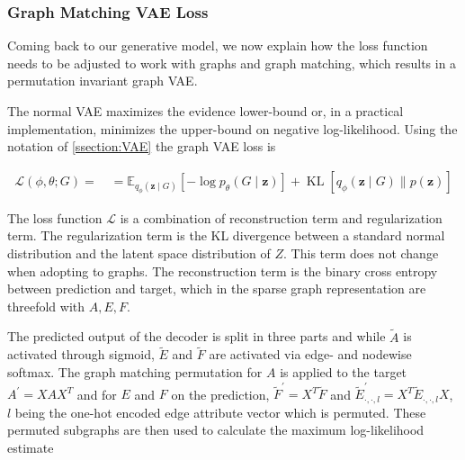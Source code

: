 \subsubsection{Graph Matching VAE Loss}
\label{ssec3:GVAEloss}
Coming back to our generative model, we now explain how the loss function needs to be adjusted to work with graphs and graph matching, which results in a permutation invariant graph VAE.

The normal VAE maximizes the evidence lower-bound or, in a practical implementation, minimizes the upper-bound on negative log-likelihood. Using the notation of \ref{ssection:VAE} the graph VAE loss is

\begin{equation}
    \begin{array}{l}
    \mathcal{L}(\phi, \theta ; G)=\quad=\mathbb{E}_{q_{\phi}(\mathbf{z} \mid G)}\left[-\log p_{\theta}(G \mid \mathbf{z})\right]+\operatorname{KL}\left[q_{\phi}(\mathbf{z} \mid G) \| p(\mathbf{z})\right]
    \end{array}
\end{equation}

The loss function $\mathcal{L}$ is a combination of reconstruction term and regularization term. The regularization term is the KL divergence between a standard normal distribution and the latent space distribution of $Z$. This term does not change when adopting to graphs. The reconstruction term is the binary cross entropy between prediction and target, which in the sparse graph representation are threefold with $A, E, F$. 



The predicted output of the decoder is split in three parts and while $\tilde{A}$ is activated through sigmoid, $\tilde{E}$ and $\tilde{F}$ are activated via edge- and nodewise softmax. The graph matching permutation for $A$ is applied to the target $A^{\prime}=X A X^{T}$ and for $E$ and $F$ on the prediction, $\widetilde{F}^{\prime}=X^{T} \widetilde{F}$ and $\widetilde{E}_{\cdot, \cdot, l}^{\prime}=X^{T} \widetilde{E}_{\cdot, \cdot, l} X$, $l$ being the one-hot encoded edge attribute vector which is permuted. These permuted subgraphs are then used to calculate the maximum log-likelihood estimate \cite{simonovsky_graphvae_2018}

